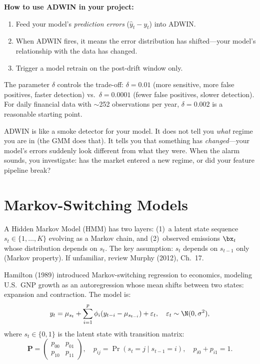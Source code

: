 \textbf{How to use ADWIN in your project:}
\begin{enumerate}[leftmargin=1.5em]
  \item Feed your model's \emph{prediction errors}
        ($\hat{y}_t - y_t$) into ADWIN.
  \item When ADWIN fires, it means the error distribution has shifted---your
        model's relationship with the data has changed.
  \item Trigger a model retrain on the post-drift window only.
\end{enumerate}

The parameter $\delta$ controls the trade-off: $\delta = 0.01$ (more
sensitive, more false positives, faster detection) vs.\ $\delta = 0.0001$
(fewer false positives, slower detection).  For daily financial data with
$\sim$252 observations per year, $\delta = 0.002$ is a reasonable starting
point.

\begin{intuition}
ADWIN is like a smoke detector for your model.  It does not tell you
\emph{what} regime you are in (the GMM does that).  It tells you that
something has \emph{changed}---your model's errors suddenly look different
from what they were.  When the alarm sounds, you investigate: has the
market entered a new regime, or did your feature pipeline break?
\end{intuition}

\section{Markov-Switching Models}
\label{sec:regimes:markov}

\begin{prereq}
A Hidden Markov Model (HMM) has two layers: (1)~a latent state sequence
$s_t \in \{1, \ldots, K\}$ evolving as a Markov chain, and (2)~observed
emissions $\bx_t$ whose distribution depends on $s_t$.  The key
assumption: $s_t$ depends on $s_{t-1}$ only (Markov property).  If
unfamiliar, review Murphy (2012), Ch.~17.
\end{prereq}

Hamilton (1989) introduced Markov-switching regression to economics,
modeling U.S.\ GNP growth as an autoregression whose mean shifts between
two states: expansion and contraction.  The model is:
\begin{equation}
  y_t = \mu_{s_t} + \sum_{i=1}^{p} \phi_i (y_{t-i} - \mu_{s_{t-i}})
  + \varepsilon_t, \quad \varepsilon_t \sim \N(0, \sigma^2),
  \label{eq:hamilton-ms}
\end{equation}
where $s_t \in \{0, 1\}$ is the latent state with transition matrix:
\begin{equation}
  \mathbf{P} = \begin{pmatrix}
    p_{00} & p_{01} \\
    p_{10} & p_{11}
  \end{pmatrix}, \quad
  p_{ij} = \Pr(s_t = j \mid s_{t-1} = i), \quad
  p_{i0} + p_{i1} = 1.
  \label{eq:transition}
\end{equation}


